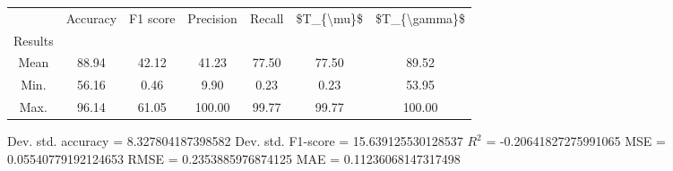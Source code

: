 \begin{tabular}{|c|c|c|c|c|c|c|}
\toprule
{} &  Accuracy &  F1 score &  Precision &  Recall &  \$T\_\{\textbackslash mu\}\$ &  \$T\_\{\textbackslash gamma\}\$ \\
Results &           &           &            &         &            &               \\
\hline
Mean    &     88.94 &     42.12 &      41.23 &   77.50 &      77.50 &         89.52 \\
Min.    &     56.16 &      0.46 &       9.90 &    0.23 &       0.23 &         53.95 \\
Max.    &     96.14 &     61.05 &     100.00 &   99.77 &      99.77 &        100.00 \\
\bottomrule
\end{tabular}

 Dev. std. accuracy = 8.327804187398582
 Dev. std. F1-score = 15.639125530128537
 $R^2$ = -0.20641827275991065
 MSE = 0.05540779192124653
 RMSE = 0.2353885976874125
 MAE = 0.11236068147317498
